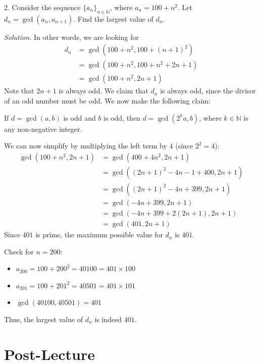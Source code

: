 \documentclass{article}
\begin{document}
    
    2. Consider the sequence $\{a_{n}\}_{n \in \mathbb{N}}$, where $a_{n} = 100 + n^{2}$. Let $d_{n} = \gcd(a_{n}, a_{n + 1})$. Find the largest value of $d_{n}$.
    
    \vspace{1.5mm} 
    \textit{Solution. } In other words, we are looking for
    \begin{align*}
        d_{n} &= \gcd(100 + n^{2}, 100 + (n+1)^{2}) \\
        &= \gcd(100 + n^{2}, 100 + n^{2} + 2n + 1) \\
        &= \gcd(100 + n^{2}, 2n + 1)
    \end{align*}
    Note that $2n + 1$ is always odd. We claim that $d_{n}$ is always odd, since the divisor of an odd number must be odd. We now make the following claim:
    
    \vspace{1.5mm}
    If $d = \gcd(a, b)$ is odd and $b$ is odd, then $d = \gcd(2^{k}a, b)$, where $k \in \mathbb{N}$ is any non-negative integer.
    
    \vspace{1.5mm}
    We can now simplify by multiplying the left term by $4$ (since $2^2 = 4$):
    \begin{align*}
        \gcd(100 + n^{2}, 2n + 1) &= \gcd(400 + 4n^{2}, 2n + 1) \\
        &= \gcd((2n + 1)^{2} - 4n - 1 + 400, 2n + 1) \\
        &= \gcd((2n + 1)^{2} - 4n + 399, 2n + 1) \\
        &= \gcd(-4n + 399, 2n + 1) \\
        &= \gcd(-4n + 399 + 2(2n + 1), 2n + 1) \\
        &= \gcd(401, 2n + 1)
    \end{align*}
    Since $401$ is prime, the maximum possible value for $d_{n}$ is $401$. 
    
    \vspace{1.5mm}
    Check for $n = 200$:
    \begin{itemize}
        \item $a_{200} = 100 + 200^2 = 40100 = 401 \times 100$
        \item $a_{201} = 100 + 201^2 = 40501 = 401 \times 101$
        \item $\gcd(40100, 40501) = 401$
    \end{itemize}
    Thus, the largest value of $d_{n}$ is indeed $401$.

\section*{Post-Lecture}
\end{document}
